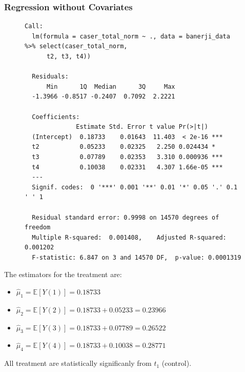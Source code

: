 \documentclass{article}
\begin{document}
\subsubsection*{Regression without Covariates}
\begin{figure}[H]
\begin{lstlisting}[style=RstyleComment, caption=Regression without Covariates]
  Call:
  lm(formula = caser_total_norm ~ ., data = banerji_data %>% select(caser_total_norm, 
      t2, t3, t4))
  
  Residuals:
      Min      1Q  Median      3Q     Max 
  -1.3966 -0.8517 -0.2407  0.7092  2.2221 
  
  Coefficients:
              Estimate Std. Error t value Pr(>|t|)    
  (Intercept)  0.18733    0.01643  11.403  < 2e-16 ***
  t2           0.05233    0.02325   2.250 0.024434 *  
  t3           0.07789    0.02353   3.310 0.000936 ***
  t4           0.10038    0.02331   4.307 1.66e-05 ***
  ---
  Signif. codes:  0 '***' 0.001 '**' 0.01 '*' 0.05 '.' 0.1 ' ' 1
  
  Residual standard error: 0.9998 on 14570 degrees of freedom
  Multiple R-squared:  0.001408,	Adjusted R-squared:  0.001202 
  F-statistic: 6.847 on 3 and 14570 DF,  p-value: 0.0001319
\end{lstlisting}
\end{figure}

The estimators for the treatment are:
\begin{itemize}
  \item $\hat{\mu}_1 = \mathbb{E}[Y(1)] = 0.18733$
  \item $\hat{\mu}_2 = \mathbb{E}[Y(2)] = 0.18733 + 0.05233 = 0.23966$
  \item $\hat{\mu}_3 = \mathbb{E}[Y(3)] = 0.18733 + 0.07789 = 0.26522$
  \item $\hat{\mu}_4 = \mathbb{E}[Y(4)] = 0.18733 + 0.10038 = 0.28771$
\end{itemize}

All treatment are statistically significanly from $t_1$ (control).
\end{document}
